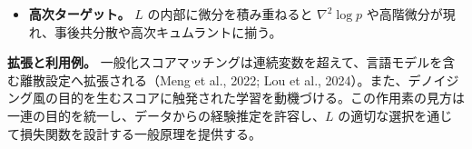\begin{itemize}
\item \textbf{高次ターゲット。} $L$ の内部に微分を積み重ねると $\nabla^2\log p$ や高階微分が現れ、事後共分散や高次キュムラントに揃う。
\end{itemize}


\textbf{拡張と利用例。} 一般化スコアマッチングは連続変数を超えて、言語モデルを含む離散設定へ拡張される（Meng et al., 2022; Lou et al., 2024）。また、デノイジング風の目的を生むスコアに触発された学習を動機づける。この作用素の見方は一連の目的を統一し、データからの経験推定を許容し、$L$ の適切な選択を通じて損失関数を設計する一般原理を提供する。

